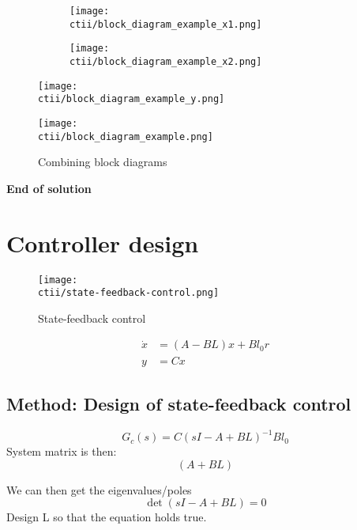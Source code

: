 \begin{multicols}{2}
\begin{figure}[H]
    \centering
    \begin{subfigure}[b]{0.24\textwidth}
        \centering
        \texttt{[image: \\ctii/block\_diagram\_example\_x1.png]}
        \caption{}
    \end{subfigure}
    \hfill
    \begin{subfigure}[b]{0.24\textwidth}
        \centering
        \texttt{[image: \\ctii/block\_diagram\_example\_x2.png]}
        \caption{}
    \end{subfigure}
    \caption{}
\end{figure}

\begin{figure}[H]
    \centering
    \texttt{[image: \\ctii/block\_diagram\_example\_y.png]}
    \caption{}
\end{figure}

\begin{figure}[H]
    \centering
    \texttt{[image: \\ctii/block\_diagram\_example.png]}
    \caption{Combining block diagrams}
\end{figure}
\textbf{End of solution}


\section{Controller design}
\begin{figure}[H]
    \centering
    \texttt{[image: \\ctii/state-feedback-control.png]}
    \caption{State-feedback control}
\end{figure}

\begin{align*}
    \dot{x} &= (A-BL)x + Bl_0 r \\
    y &= Cx
\end{align*}


\subsection{Method: Design of state-feedback control}
\begin{equation*}
    G_c(s) = C(sI-A+BL)^{-1}Bl_0
\end{equation*}
System matrix is then:
\begin{equation*}
    (A+BL)
\end{equation*}

We can then get the eigenvalues/poles 
\begin{equation*}
    \det(sI-A+BL) = 0
\end{equation*}
Design L so that the equation holds true.


\end{multicols}
